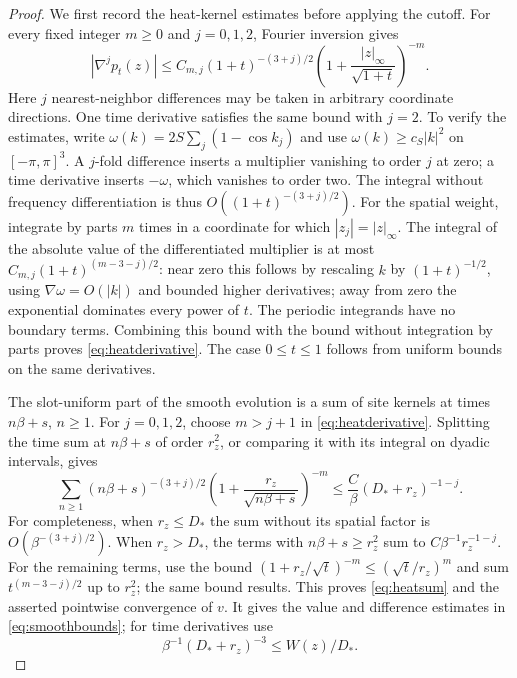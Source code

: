 \begin{proof}
We first record the heat-kernel estimates before applying the cutoff.
For every fixed integer $m\ge0$ and $j=0,1,2$, Fourier inversion gives
\begin{equation}\label{eq:heatderivative}
 |\nabla^j p_t(z)|
 \le C_{m,j}(1+t)^{-(3+j)/2}
       \left(1+\frac{|z|_\infty}{\sqrt{1+t}}\right)^{-m}.
\end{equation}
Here $j$ nearest-neighbor differences may be taken in arbitrary
coordinate directions.  One time derivative satisfies the same bound
with $j=2$.
To verify the estimates, write
$\omega(k)=2S\sum_j(1-\cos k_j)$ and use
$\omega(k)\ge c_S|k|^2$ on $[-\pi,\pi]^3$.
A $j$-fold difference inserts a multiplier vanishing to order $j$
at zero; a time derivative inserts $-\omega$, which vanishes to
order two.  The integral without frequency differentiation is thus
$O((1+t)^{-(3+j)/2})$.
For the spatial weight, integrate by parts $m$ times in a coordinate
for which $|z_j|=|z|_\infty$.  The integral of the absolute value
of the differentiated multiplier is at most
$C_{m,j}(1+t)^{(m-3-j)/2}$: near zero this follows by rescaling
$k$ by $(1+t)^{-1/2}$, using
$\nabla\omega=O(|k|)$ and bounded higher derivatives; away from
zero the exponential dominates every power of $t$.
The periodic integrands have no boundary terms.  Combining this
bound with the bound without integration by parts proves
\eqref{eq:heatderivative}.  The case $0\le t\le1$ follows from
uniform bounds on the same derivatives.

The slot-uniform part of the smooth evolution is a sum of site kernels
at times $n\beta+s$, $n\ge1$.  For $j=0,1,2$, choose $m>j+1$ in
\eqref{eq:heatderivative}.  Splitting the time sum at $n\beta+s$
of order $r_z^2$, or comparing it with its integral on dyadic
intervals, gives
\begin{equation}\label{eq:heatsum}
 \sum_{n\ge1}(n\beta+s)^{-(3+j)/2}
     \left(1+\frac{r_z}{\sqrt{n\beta+s}}\right)^{-m}
 \le \frac{C}{\beta}(D_*+r_z)^{-1-j}.
\end{equation}
For completeness, when $r_z\le D_*$ the sum without its spatial
factor is $O(\beta^{-(3+j)/2})$.  When $r_z>D_*$, the terms with
$n\beta+s\ge r_z^2$ sum to $C\beta^{-1}r_z^{-1-j}$.
For the remaining terms, use the bound
$(1+r_z/\sqrt t)^{-m}\le(\sqrt t/r_z)^m$ and sum
$t^{(m-3-j)/2}$ up to $r_z^2$; the same bound results.
This proves \eqref{eq:heatsum} and the asserted pointwise convergence
of $v$.
It gives the value and difference estimates in
\eqref{eq:smoothbounds}; for time derivatives use
\[
 \beta^{-1}(D_*+r_z)^{-3}\le W(z)/D_*.
\]


\end{proof}
